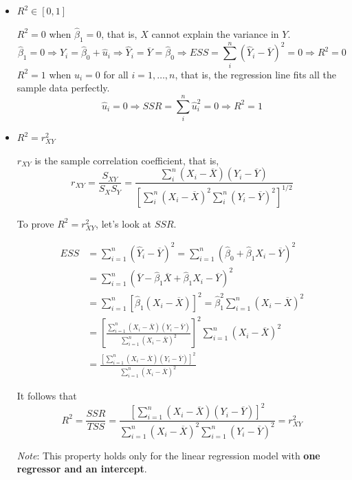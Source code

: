 \documentclass[a4paper,11pt]{article}
\begin{document}
\begin{itemize}
\item \(R^2 \in [0, 1]\)
\label{sec:org64cb7fc}

\(R^2 = 0\) when \(\hat{\beta}_1 = 0\), that is, \(X\) cannot explain the
variance in \(Y\).
\begin{equation*}
\hat{\beta}_1 = 0 \Rightarrow Y_i = \hat{\beta}_0 + \hat{u}_i
\Rightarrow \hat{Y}_i = \overline{Y} = \hat{\beta}_0 \Rightarrow ESS
= \sum_i^n (\hat{Y}_i - \overline{Y})^2 = 0 \Rightarrow R^2 = 0
\end{equation*}
\(R^2 = 1\) when \(\hat{u}_i = 0\) for all \(i = 1, \ldots, n\), that is,
the regression line fits all the sample data perfectly.
\[ \hat{u}_i = 0 \Rightarrow SSR = \sum_i^n \hat{u}_i^2 = 0
  \Rightarrow R^2 = 1 \]

\item \(R^2 = r^2_{XY}\)
\label{sec:orga15137f}

\(r_{XY}\) is the sample correlation coefficient, that is,
\[ r_{XY} = \frac{S_{XY}}{S_X S_Y} = \frac{\sum_i^n(X_i -
  \overline{X})(Y_i - \overline{Y})}{\left[\sum_i^n (X_i - \overline{X})^2 \sum_i^n (Y_i -
  \overline{Y})^2 \right]^{1/2}} \]

To prove \(R^2 = r^2_{XY}\), let's look at \(SSR\).

\begin{align*}
ESS &= \sum_{i=1}^n (\hat{Y}_i - \overline{Y})^2 = \sum_{i=1}^n (\hat{\beta}_0 + \hat{\beta}_1 X_i - \overline{Y})^2 \\
&= \sum_{i=1}^n (\overline{Y} - \hat{\beta}_1 \overline{X} + \hat{\beta}_1 X_i - \overline{Y})^2 \\
&= \sum_{i=1}^n \left[ \hat{\beta}_1 (X_i - \overline{X}) \right]^2 = \hat{\beta}_1^2 \sum_{i=1}^n (X_i - \overline{X})^2 \\
&= \left[\frac{\sum_{i=1}^n (X_i - \overline{X})(Y_i - \overline{Y})}{\sum_{i=1}^n (X_i - \overline{X})^2}\right]^2 \sum_{i=1}^n (X_i - \overline{X})^2 \\
&= \frac{\left[ \sum_{i=1}^n (X_i - \overline{X})(Y_i - \overline{Y}) \right]^2}{\sum_{i=1}^n (X_i - \overline{X})^2}
\end{align*}

It follows that
\[
  R^2 = \frac{SSR}{TSS} = \frac{\left[ \sum_{i=1}^n (X_i - \overline{X})(Y_i - \overline{Y}) \right]^2}{\sum_{i=1}^n (X_i - \overline{X})^2 \sum_{i=1}^n (Y_i - \overline{Y})^2} = r^2_{XY}
  \]

\emph{Note}: This property holds only for the linear regression model
with \textbf{one regressor and an intercept}.
\end{itemize}
\end{document}
